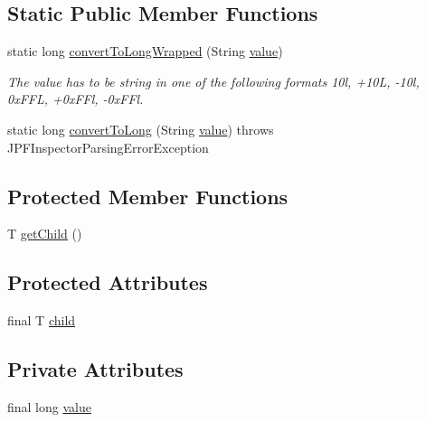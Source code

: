 \subsection*{Static Public Member Functions}
\begin{DoxyCompactItemize}
\item 
static long \hyperlink{classgov_1_1nasa_1_1jpf_1_1inspector_1_1server_1_1expression_1_1expressions_1_1_expression_state_value_const_long_a44d5930188773e42046b31c939a5f824}{convert\+To\+Long\+Wrapped} (String \hyperlink{classgov_1_1nasa_1_1jpf_1_1inspector_1_1server_1_1expression_1_1expressions_1_1_expression_state_value_const_long_aca83e5db34ca840e172b2ad55feb8c40}{value})
\begin{DoxyCompactList}\small\item\em The value has to be string in one of the following formats 10l, +10L, -\/10l, 0x\+F\+FL, +0x\+F\+Fl, -\/0x\+F\+Fl. \end{DoxyCompactList}\item 
static long \hyperlink{classgov_1_1nasa_1_1jpf_1_1inspector_1_1server_1_1expression_1_1expressions_1_1_expression_state_value_const_long_a8a01c0823026dfe87095be86882f7da9}{convert\+To\+Long} (String \hyperlink{classgov_1_1nasa_1_1jpf_1_1inspector_1_1server_1_1expression_1_1expressions_1_1_expression_state_value_const_long_aca83e5db34ca840e172b2ad55feb8c40}{value})  throws J\+P\+F\+Inspector\+Parsing\+Error\+Exception 
\end{DoxyCompactItemize}
\subsection*{Protected Member Functions}
\begin{DoxyCompactItemize}
\item 
T \hyperlink{classgov_1_1nasa_1_1jpf_1_1inspector_1_1server_1_1expression_1_1_expression_state_unary_operator_a150bac338d6557f79ca185d3f6ad6e06}{get\+Child} ()
\end{DoxyCompactItemize}
\subsection*{Protected Attributes}
\begin{DoxyCompactItemize}
\item 
final T \hyperlink{classgov_1_1nasa_1_1jpf_1_1inspector_1_1server_1_1expression_1_1_expression_state_unary_operator_a66041b1f569a361549e28a00f7ca5f2f}{child}
\end{DoxyCompactItemize}
\subsection*{Private Attributes}
\begin{DoxyCompactItemize}
\item 
final long \hyperlink{classgov_1_1nasa_1_1jpf_1_1inspector_1_1server_1_1expression_1_1expressions_1_1_expression_state_value_const_long_aca83e5db34ca840e172b2ad55feb8c40}{value}
\end{DoxyCompactItemize}


